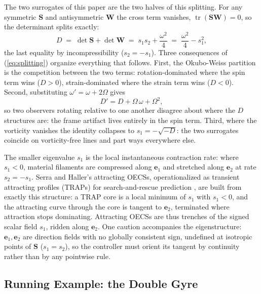 \documentclass[lettersize,journal]{IEEEtran}
\begin{document}
The two surrogates of this paper are the two halves of this splitting.
For any symmetric $\mathbf{S}$ and antisymmetric $\mathbf{W}$ the cross
term vanishes, $\operatorname{tr}(\mathbf{S}\mathbf{W}) = 0$, so the
determinant splits exactly:
\begin{equation}
    D \;=\; \det\mathbf{S} + \det\mathbf{W}
      \;=\; s_1 s_2 + \frac{\omega^2}{4}
      \;=\; \frac{\omega^2}{4} - s_1^2,
    \label{eq:splitting}
\end{equation}
the last equality by incompressibility ($s_2 = -s_1$). Three
consequences of (\ref{eq:splitting}) organize everything that follows.
First, the Okubo-Weiss partition is the competition between the two
terms: rotation-dominated where the spin term wins ($D > 0$),
strain-dominated where the strain term wins ($D < 0$). Second,
substituting $\omega' = \omega + 2\Omega$ gives
\begin{equation}
    D' = D + \Omega\,\omega + \Omega^2,
    \label{eq:D_not_objective}
\end{equation}
so two observers rotating relative to one another disagree about where
the $D$ structures are: the frame artifact lives entirely in the spin
term. Third, where the vorticity vanishes the identity collapses to
$s_1 = -\sqrt{-D}$: the two surrogates coincide on vorticity-free
lines and part ways everywhere else.

The smaller eigenvalue $s_1$ is the local instantaneous contraction
rate: where $s_1 < 0$, material filaments are compressed along
$\mathbf{e}_1$ and stretched along $\mathbf{e}_2$ at rate $s_2 = -s_1$.
Serra and Haller's attracting OECSs, operationalized as transient
attracting profiles (TRAPs) for search-and-rescue prediction
\cite{17,36}, are built from exactly this structure: a TRAP core is a
local minimum of $s_1$ with $s_1 < 0$, and the attracting curve through
the core is tangent to $\mathbf{e}_2$, terminated where attraction
stops dominating. Attracting OECSs are thus trenches of the signed
scalar field $s_1$, ridden along $\mathbf{e}_2$. One caution
accompanies the eigenstructure: $\mathbf{e}_1, \mathbf{e}_2$ are
direction fields with no globally consistent sign, undefined at
isotropic points of $\mathbf{S}$ ($s_1 = s_2$), so the controller must
orient its tangent by continuity rather than by any pointwise rule.

\subsection{Running Example: the Double Gyre}
\label{sec:dg_example}
\end{document}
